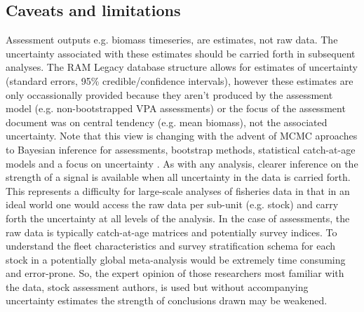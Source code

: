 \documentclass[letterpaper,12pt]{article}
\begin{document}
\subsection{Caveats and limitations}
Assessment outputs e.g. biomass timeseries, are estimates, not raw data. The uncertainty associated with these estimates should be carried forth in subsequent analyses. The RAM Legacy database structure allows for estimates of uncertainty (standard errors, 95\% credible/confidence intervals), however these estimates are only occassionally provided because they aren't produced by the assessment model (e.g. non-bootstrapped VPA assessments) or the focus of the assessment document was on central tendency (e.g. mean biomass), not the associated uncertainty. Note that this view is changing with the advent of MCMC aproaches to Bayesian inference for assessments, bootstrap methods, statistical catch-at-age models and a focus on uncertainty \citep{Walters:Maguire:1996:reviews}. As with any analysis, clearer inference on the strength of a signal is available when all uncertainty in the data is carried forth. This represents a difficulty for large-scale analyses of fisheries data in that in an ideal world one would access the raw data per sub-unit (e.g. stock) and carry forth the uncertainty at all levels of the analysis. In the case of assessments, the raw data is typically catch-at-age matrices and potentially survey indices. To understand the fleet characteristics and survey stratification schema for each stock in a potentially global meta-analysis would be extremely time consuming and error-prone. So, the expert opinion of those researchers most familiar with the data, stock assessment authors, is used but without accompanying uncertainty estimates the strength of conclusions drawn may be weakened.
\end{document}
